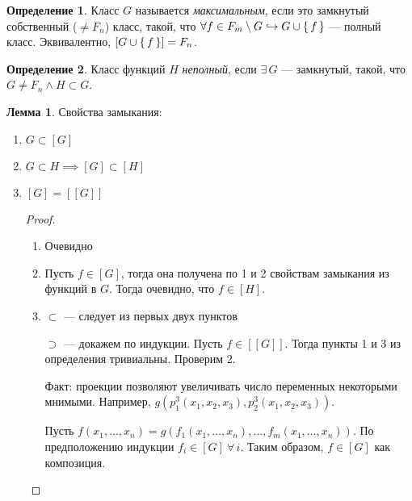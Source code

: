 \documentclass[12pt]{article}
\let\un\cup
\let\wot\setminus
\theoremstyle{definition}
\newtheorem{definition}{Определение}[section]
\theoremstyle{statement}
\theoremstyle{theorem}
\newtheorem{lemma}{Лемма}[section]
\begin{document}
\begin{definition}
  Класс $G$ называется \textit{максимальным}, если это замкнутый
  собственный ($\neq F_n$) класс, такой, что $\forall f \in F_m \wot
  G \hookrightarrow G \un \set{f}$ --- полный класс. Эквивалентно,
  $[G \un \set{f}] = F_n$.
\end{definition}
\begin{definition}
  Класс функций $H$ \textit{неполный}, если $\exists\, G$ ---
  замкнутый, такой, что $G \neq F_n \land H \subset G$.
\end{definition}
\begin{lemma}
  Свойства замыкания:
  \begin{enumerate}
    \item $G \subset [G]$

    \item $G \subset H \implies [G] \subset [H]$

    \item $[G] = [[G]]$
      \begin{proof}
        \begin{enumerate}
          \item Очевидно

          \item Пусть $f \in [G]$, тогда она получена по 1 и 2
            свойствам замыкания из функций в $G$. Тогда очевидно, что
            $f \in [H]$.

          \item
            $\subset$ --- следует из первых двух пунктов

            $\supset$ --- докажем по индукции. Пусть $f \in [[G]]$. Тогда
            пункты 1 и 3 из определения тривиальны. Проверим 2.

            Факт: проекции позволяют увеличивать число переменных
            некоторыми мнимыми. Например, $g(p_1^3(x_1, x_2, x_3),
            p_2^3(x_1, x_2, x_3))$.

            Пусть $f(x_1, \ldots, x_n) = g(f_1(x_1, \ldots, x_n), \ldots,
            f_m(x_1, \ldots, x_n))$. По предположению индукции $f_i \in
            [G]\ \forall\, i$. Таким образом, $f \in [G]$ как композиция.
        \end{enumerate}
      \end{proof}
  \end{enumerate}
\end{lemma}
\end{document}
